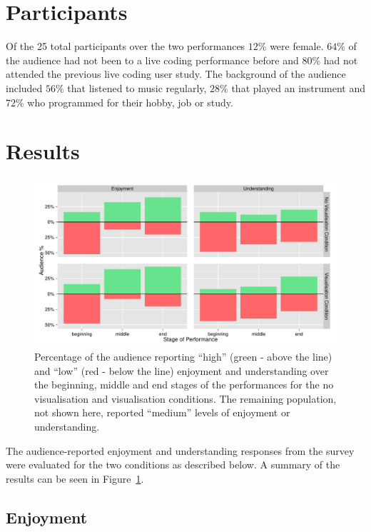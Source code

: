 \section{Participants}

Of the 25 total participants over the two performances $12\%$ were female. $64\%$ of the audience had not been to a live coding performance before and $80\%$ had not attended the previous live coding user study. The background of the audience included $56\%$ that listened to music regularly, $28\%$ that played an instrument and $72\%$ who programmed for their hobby, job or study.

\section{Results}

\begin{figure}
  \centering
  \includegraphics[width=\columnwidth]{../study-3/results/dimension-condition-study-3.pdf}
  \caption[Follow-up user study survey condition and dimension results]{Percentage of the audience reporting ``high'' (green - above the line) and ``low'' (red - below the line) enjoyment and understanding over the beginning, middle and end stages of the performances for the no visualisation and visualisation conditions. The remaining population, not shown here, reported ``medium'' levels of enjoyment or understanding.}
  \label{fig:dimension-condition-follow-up-user-study}
\end{figure}

The audience-reported enjoyment and understanding responses from the survey were evaluated for the two conditions as described below. A summary of the results can be seen in Figure~\ref{fig:dimension-condition-follow-up-user-study}.

\subsection{Enjoyment}

